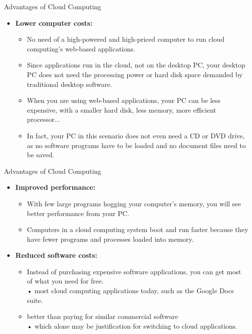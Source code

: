 \documentclass{SKP-beamer}
\begin{document}
\begin{frame}{Advantages of Cloud Computing}
	\begin{itemize}
		
		\item  \textbf{Lower computer costs:}
		\begin{itemize}
			\item  No need of a high-powered and high-priced computer to run cloud computing's 
			web-based applications.
			\item  Since applications run in the cloud, not on the desktop PC, your desktop PC does not 
			need the processing power or hard disk space demanded by traditional desktop 
			software.
			\item  When you are using web-based applications, your PC can be less expensive, with a
			smaller hard disk, less memory, more efficient processor...
			\item  In fact, your PC in this scenario does not even need a CD or DVD drive, as no 
			software programs have to be loaded and no document files need to be saved.
			
		\end{itemize}
		
	\end{itemize}
\end{frame}
\begin{frame}{Advantages of Cloud Computing}
	\begin{itemize}
		
		\item  \textbf{Improved performance:}
		\begin{itemize}
			\item  With few large programs hogging your computer's memory, you will see better 
			performance from your PC.
			\item  Computers in a cloud computing system boot and run faster because they have 
			fewer programs and processes loaded into memory.
			
		\end{itemize}
		\item  \textbf{Reduced software costs:}
		\begin{itemize}
			\item  Instead of purchasing expensive software applications, you can get most of what 
			you need for free. \\
			• most cloud computing applications today, such as the Google Docs suite.
			\item  better than paying for similar commercial software \\
			• which alone may be justification for switching to cloud applications.
			
			
		\end{itemize}
	\end{itemize}
\end{frame}
\end{document}
